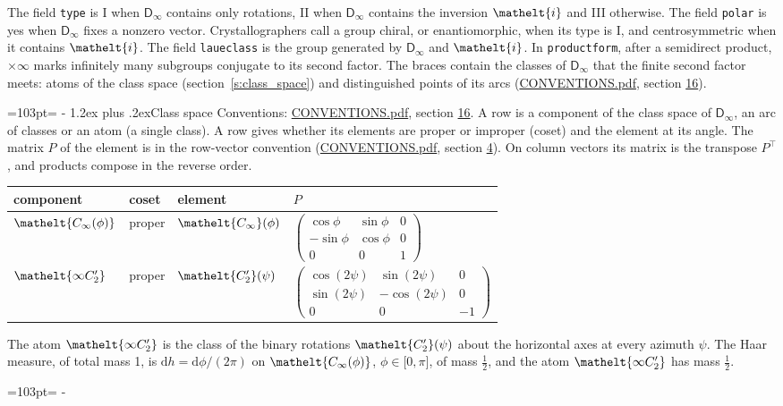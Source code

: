 \documentclass[10pt,a4paper]{article}
\makeatletter
\renewcommand\section{\@startsection{section}{1}{\z@}{-3ex plus -1ex minus -.2ex}%
  {1.2ex plus .2ex}{\normalfont\large\sffamily\bfseries\color{parttitle}}}
\newcommand{\needspace}[1]{\par\penalty-100\begingroup\dimen0=#1\relax\dimen2=\pagegoal
  \advance\dimen2-\pagetotal\ifdim\dimen0>\dimen2\relax\ifdim\dimen2>0pt\vfil\break\fi\fi
  \endgroup}
\numberwithin{equation}{section}
\newcommand{\eltfont}[1]{{\let\sigma\eltsigma\mathelt{#1}}}
\newcommand{\grp}[1]{\mathsf{#1}}
\newcommand{\comp}[1]{\eltfont{#1}}
\newcommand{\elt}[1]{\eltfont{#1}}
\newcommand{\diff}{\mathrm{d}}
\makeatother
\begin{document}
\leavevmode\label{n:element.inversion}The field \texttt{type} is I when $\grp{D_{\infty}}$ contains only rotations, II when $\grp{D_{\infty}}$ contains the inversion $\elt{i}$ and III otherwise. The field \texttt{polar} is yes when $\grp{D_{\infty}}$ fixes a nonzero vector. Crystallographers call a group chiral, or enantiomorphic, when its type is I, and centrosymmetric when it contains $\elt{i}$. The field \texttt{laueclass} is the group generated by $\grp{D_{\infty}}$ and $\elt{i}$.
In \texttt{productform}, after a semidirect product, ${\times}\infty$ marks infinitely many subgroups conjugate to its second factor. The braces contain the classes of $\grp{D_{\infty}}$ that the finite second factor meets: atoms of the class space (section~\ref{s:class_space}) and distinguished points of its arcs (\href{../../CONVENTIONS.pdf}{CONVENTIONS.pdf}, section \href{../../CONVENTIONS.pdf\#conv.16}{16}).
\needspace{103pt}
\section{Class space}\label{s:class_space}
Conventions: \href{../../CONVENTIONS.pdf}{CONVENTIONS.pdf}, section \href{../../CONVENTIONS.pdf\#conv.16}{16}.
\leavevmode\label{n:angle.phi}\label{n:mark.atom}\label{n:angle.psi}\label{n:head.component}A row is a component of the class space of $\grp{D_{\infty}}$, an arc of classes or an atom (a single class). \label{n:head.coset}\label{n:head.element}A row gives whether its elements are proper or improper (coset) and the element at its angle. The matrix $P$ of the element is in the row-vector convention (\href{../../CONVENTIONS.pdf}{CONVENTIONS.pdf}, section \href{../../CONVENTIONS.pdf\#conv.4}{4}). On column vectors its matrix is the transpose $P^{\top}$, and products compose in the reverse order.
\begin{center}\begin{tabular}{@{}llll@{}}\toprule
component & coset & element & $P$\\\midrule
$\comp{C_{\infty}(\phi)}$ & proper & $\elt{C_{\infty}}(\phi)$ & $\left(\begin{smallmatrix}\cos\phi & \sin\phi & 0\\-\sin\phi & \cos\phi & 0\\0 & 0 & 1\end{smallmatrix}\right)$\\\addlinespace[6pt]
$\comp{\infty C_2'}$ & proper & $\elt{C_2'}(\psi)$ & $\left(\begin{smallmatrix}\cos(2\psi) & \sin(2\psi) & 0\\\sin(2\psi) & -\cos(2\psi) & 0\\0 & 0 & -1\end{smallmatrix}\right)$\\
\bottomrule\end{tabular}\end{center}
The atom $\comp{\infty C_2'}$ is the class of the binary rotations $\elt{C_2'}(\psi)$ about the horizontal axes at every azimuth $\psi$.
\leavevmode\label{n:local.haar.h}The Haar measure, of total mass 1, is $\diff h = \diff\phi/(2\pi)$ on $\comp{C_{\infty}(\phi)}$, $\phi\in\bigl[0, \pi\bigr]$, of mass $\tfrac{1}{2}$, and the atom $\comp{\infty C_2'}$ has mass $\tfrac{1}{2}$.
\needspace{103pt}
\end{document}
